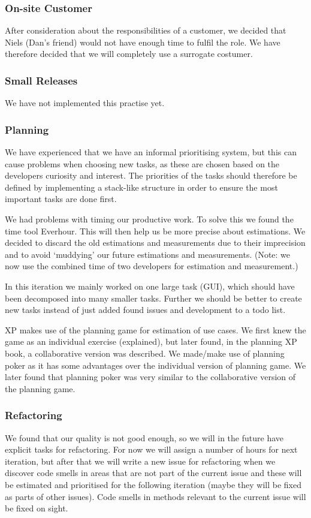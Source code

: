 \subsubsection{On-site Customer}
After consideration about the responsibilities of a customer, we decided that Niels (Dan’s friend) would not have enough time to fulfil the role.
We have therefore decided that we will completely use a surrogate costumer.

\subsubsection{Small Releases}
We have not implemented this practise yet.

\subsubsection{Planning}
We have experienced that we have an informal prioritising system, but this can cause problems when choosing new tasks, as these are chosen based on the developers curiosity and interest. The priorities of the tasks should therefore be defined by implementing a stack-like structure in order to ensure the most important tasks are done first.

We had problems with timing our productive work. To solve this we found the time tool Everhour.
This will then help us be more precise about estimations.
We decided to discard the old estimations and measurements due to their imprecision and to avoid `muddying' our future estimations and measurements. (Note: we now use the combined time of two developers for estimation and measurement.)

In this iteration we mainly worked on one large task (GUI), which should have been decomposed into many smaller tasks. Further we should be better to create new tasks instead of just added found issues and development to a todo list.

XP makes use of the planning game for estimation of use cases. We first knew the game as an individual exercise (explained), but later found, in the planning XP book, a collaborative version was described. We made/make use of planning poker as it has some advantages over the individual version of planning game. We later found that planning poker was very similar to the collaborative version of the planning game. 

\subsubsection{Refactoring}
We found that our quality is not good enough, so we will in the future have explicit tasks for refactoring.
For now we will assign a number of hours for next iteration, but after that we will write a new issue for refactoring when we discover code smells in areas that are not part of the current issue and these will be estimated and prioritised for the following iteration (maybe they will be fixed as parts of other issues). Code smells in methods relevant to the current issue will be fixed on sight.

